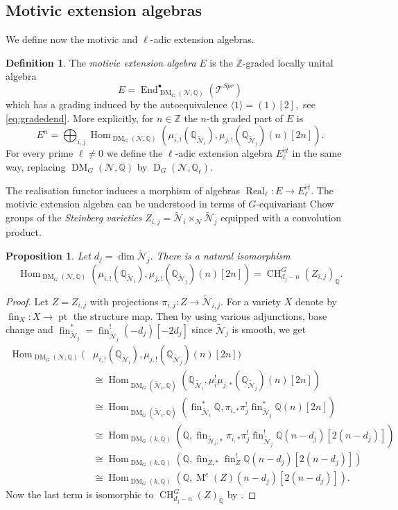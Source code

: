 \documentclass{amsart}
\theoremstyle{plain}
\newtheorem{proposition}[theorem]{Proposition}
\theoremstyle{TheoremNum}
\theoremstyle{definition}
\newtheorem{definition}[theorem]{Definition}
\theoremstyle{remark}
\numberwithin{equation}{section}
\newcommand{\Q}{\mathbb{Q}}
\newcommand{\Z}{\mathbb{Z}}
\newcommand{\M}{\widetilde{\mathcal{N}}}
\newcommand{\N}{\mathcal{N}}
\newcommand{\Stein}{Z}
\newcommand{\Tt}{\mathcal{T}}
\newcommand{\Chow}{\operatorname{CH}}
\newcommand{\Mot}{\operatorname{M}}
\newcommand{\D}{\operatorname{D}}
\newcommand{\DM}{\operatorname{DM}}
\newcommand{\Hom}{\operatorname{Hom}}
\newcommand{\End}{\operatorname{End}}
\newcommand{\fin}{\operatorname{fin}}
\newcommand{\poi}{\operatorname{pt}}
\newcommand{\Real}{\operatorname{Real}}
\newcommand{\DerG}{\operatorname{D}}
\begin{document}
\subsection{Motivic extension algebras}
We define now the motivic and $\ell$-adic extension algebras.
\begin{definition}\label{def:motivicextensionalgebra}
The \emph{motivic extension algebra} $E$ is the $\Z$-graded locally unital algebra $$E=\End^\bullet_{\DM_G(\N,\Q)}(\Tt^{Spr})$$ which has a grading induced by the autoequivalence $\langle 1\rangle=(1)[2],$ see \eqref{eq:gradedend}. More explicitly, for $n\in \Z$ the $n$-th graded part of $E$ is
$$E^n=\bigoplus_{i,j}\Hom_{\DM_G(\N,\Q)}(\mu_{i,!}(\Q_{\M_i}),\mu_{j,!}(\Q_{\M_j})(n)[2n]).$$
For every prime $\ell\neq 0$ we define the $\ell$-adic extension  algebra $E^{\acute{e}t}_\ell$ in the same way, replacing $\DM_G(\N,\Q)$ by $\DerG_G(\N,\Q_\ell).$
\end{definition}
The realisation functor induces a morphism of algebras
$\Real_\ell: E\to E^{\acute{e}t}_\ell$.
The motivic extension algebra can be understood in terms of $G$-equivariant Chow groups of the \emph{Steinberg varieties} $\Stein_{i,j}=\M_i\times_\N\M_j$ equipped with a convolution product. %
\begin{proposition}
Let  $d_j=\dim \M_j.$ There is a natural isomorphism
$$\Hom_{\DM_G(\N,\Q)}(\mu_{i,!}(\Q_{\M_i}),\mu_{j,!}(\Q_{\M_j})(n)[2n])=\Chow_{d_j-n}^G(Z_{i,j})_\Q.$$
\end{proposition}
\begin{proof} Let $Z=Z_{i,j}$ with projections $\pi_{i,j}:Z\to \M_{i,j}.$ For a variety $X$ denote by $\fin_X:X\to \poi$ the structure map. Then by using various adjunctions, base change and $\fin_{\M_j}^*=\fin_{\M_j}^!(-d_j)[-2d_j]$ since $\M_j$ is smooth, we get
\begin{align*}
    \Hom_{\DM_G(\N,\Q)}(&\mu_{i,!}(\Q_{\M_i}), \mu_{j,!}(\Q_{\M_j})(n)[2n])\\
    &\cong\Hom_{\DM_G(\M_i,\Q)}(\Q_{\M_i},\mu_i^!\mu_{j,*}(\Q_{\M_j})(n)[2n])\\
    &\cong\Hom_{\DM_G(\M_i,\Q)}(\fin_{\M_i}^*\Q,\pi_{i,*}\pi_{j}^!\fin_{\M_j}^*\Q(n)[2n])\\
    &\cong\Hom_{\DM_G(k,\Q)}(\Q,\fin_{\M_i,*}\pi_{i,*}\pi_{j}^!\fin_{\M_j}^!\Q(n-d_j)[2(n-d_j)])\\
    &\cong\Hom_{\DM_G(k,\Q)}(\Q,\fin_{Z,*}\fin_{Z}^!\Q(n-d_j)[2(n-d_j)])\\
    &\cong\Hom_{\DM_G(k,\Q)}(\Q,\Mot^c(Z)(n-d_j)[2(n-d_j)]).
\end{align*}
Now the last term is isomorphic to $\Chow^G_{d_j-n}(Z)_\Q$ by \cite[Theorem 5.3.14]{kelly_voevodsky_2017}.
\end{proof}
\end{document}
